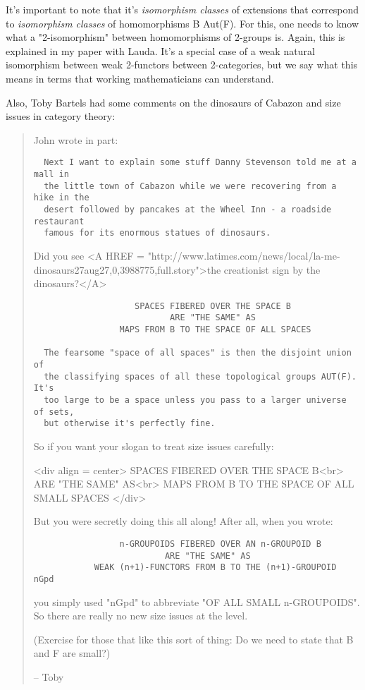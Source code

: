 It's important to note that it's \emph{isomorphism classes} of extensions 
that correspond to \emph{isomorphism classes} of homomorphisms B \to  
Aut(F).  
For this, one needs to know what a "2-isomorphism" 
between homomorphisms 
of 2-groups is.  Again, this is explained in my paper with Lauda.  It's 
a special case of a weak natural isomorphism between weak 2-functors 
between 2-categories, but we say what this means in terms that working
mathematicians can understand. 

Also, Toby Bartels had some comments on the dinosaurs of Cabazon
and size issues in category theory:

\begin{quote}
John wrote in part:

\begin{verbatim}
  Next I want to explain some stuff Danny Stevenson told me at a mall in
  the little town of Cabazon while we were recovering from a hike in the
  desert followed by pancakes at the Wheel Inn - a roadside restaurant
  famous for its enormous statues of dinosaurs.
\end{verbatim}
    

Did you see <A HREF = "http://www.latimes.com/news/local/la-me-dinosaurs27aug27,0,3988775,full.story">the creationist sign by the dinosaurs?</A>

\begin{verbatim}
                    SPACES FIBERED OVER THE SPACE B
                           ARE "THE SAME" AS
                 MAPS FROM B TO THE SPACE OF ALL SPACES

  The fearsome "space of all spaces" is then the disjoint union of
  the classifying spaces of all these topological groups AUT(F). It's
  too large to be a space unless you pass to a larger universe of sets,
  but otherwise it's perfectly fine.
\end{verbatim}
    

So if you want your slogan to treat size issues carefully:

<div align = center>
SPACES FIBERED OVER THE SPACE B<br>
  ARE "THE SAME" AS<br>
MAPS FROM B TO THE SPACE OF ALL SMALL SPACES
</div>

But you were secretly doing this all along!
After all, when you wrote:

\begin{verbatim}
                 n-GROUPOIDS FIBERED OVER AN n-GROUPOID B
                          ARE "THE SAME" AS
            WEAK (n+1)-FUNCTORS FROM B TO THE (n+1)-GROUPOID nGpd
\end{verbatim}
    

you simply used "nGpd" to abbreviate "OF ALL 
SMALL n-GROUPOIDS".
So there are really no new size issues at the \omega  level.

(Exercise for those that like this sort of thing:
Do we need to state that B and F are small?)


-- Toby
\end{quote}


